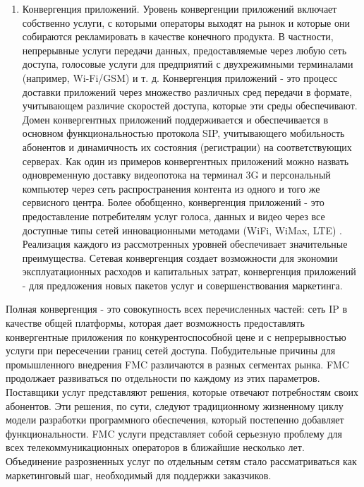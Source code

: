 \begin{enumerate}
\item Конвергенция приложений. Уровень конвергенции приложений включает собственно услуги, с которыми операторы выходят на рынок и которые они собираются рекламировать в качестве конечного продукта. В частности, непрерывные услуги передачи данных, предоставляемые через любую сеть доступа, голосовые услуги для предприятий с двухрежимными терминалами (например, Wi-Fi/GSM) и т. д. Конвергенция приложений - это процесс доставки приложений через множество различных сред передачи в формате, учитывающем различие скоростей доступа, которые эти среды обеспечивают. Домен конвергентных приложений поддерживается и обеспечивается в основном функциональностью протокола SIP, учитывающего мобильность абонентов и динамичность их состояния (регистрации) на соответствующих серверах. Как один из примеров конвергентных приложений можно назвать одновременную доставку видеопотока на терминал 3G и персональный компьютер через сеть распространения контента из одного и того же сервисного центра. Более обобщенно, конвергенция приложений - это предоставление потребителям услуг голоса, данных и видео через все доступные типы сетей инновационными методами (WiFi, WiMax, LTE) . Реализация каждого из рассмотренных уровней обеспечивает значительные преимущества. Сетевая конвергенция создает возможности для экономии эксплуатационных расходов и капитальных затрат, конвергенция приложений - для предложения новых пакетов услуг и совершенствования маркетинга.

\end{enumerate}

Полная конвергенция - это совокупность всех перечисленных частей: сеть IP в качестве общей платформы, которая дает возможность предоставлять конвергентные приложения по конкурентоспособной цене и с непрерывностью услуги при пересечении границ сетей доступа. Побудительные причины для промышленного внедрения FMC различаются в разных сегментах рынка. FMC продолжает развиваться по отдельности по каждому из этих параметров. Поставщики услуг представляют решения, которые отвечают потребностям своих абонентов. Эти решения, по сути, следуют традиционному жизненному циклу модели разработки программного обеспечения, который постепенно добавляет функциональности.
FMC услуги представляет собой серьезную проблему для всех телекоммуникационных операторов в ближайшие несколько лет. Объединение разрозненных услуг по отдельным сетям стало рассматриваться как маркетинговый шаг, необходимый для поддержки заказчиков.









